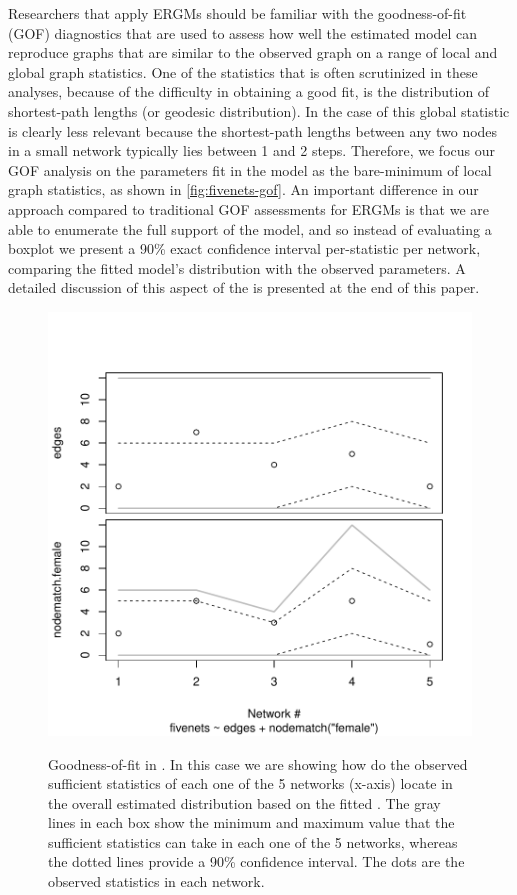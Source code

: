 \documentclass[12pt]{article}
\begin{document}
Researchers that apply ERGMs should be familiar with the goodness-of-fit (GOF) diagnostics that are used to assess how well the estimated model can reproduce graphs that are similar to the observed graph on a range of local and global graph statistics. One of the statistics that is often scrutinized in these analyses, because of the difficulty in obtaining a good fit, is the distribution of shortest-path lengths (or geodesic distribution). In the case of \ergmitos{} this global statistic is clearly less relevant because the shortest-path lengths between any two nodes in a small network typically lies between 1 and 2 steps. Therefore, we focus our GOF analysis on the parameters fit in the model as the bare-minimum of local graph statistics, as shown in \autoref{fig:fivenets-gof}. An important difference in our approach compared to traditional GOF assessments for ERGMs is that we are able to enumerate the full support of the model, and so instead of evaluating a boxplot we present a 90\% exact confidence interval per-statistic per network, comparing the fitted model's distribution with the observed parameters. A detailed discussion of this aspect of the \ergmitos{} is presented at the end of this paper.

\begin{figure}[tb]
    \centering
    \caption{Goodness-of-fit in \ergmitos{}. In this case we are showing how do the observed sufficient statistics of each one of the 5 networks (x-axis) locate in the overall estimated distribution based on the fitted \ergmito{}. The gray lines in each box show the minimum and maximum value that the sufficient statistics can take in each one of the 5 networks, whereas the dotted lines provide a 90\% confidence interval. The dots are the observed statistics in each network.}
    \includegraphics[width=.7\linewidth]{figures/fivenets_gof.pdf}
    \label{fig:fivenets-gof}
\end{figure}
\end{document}
